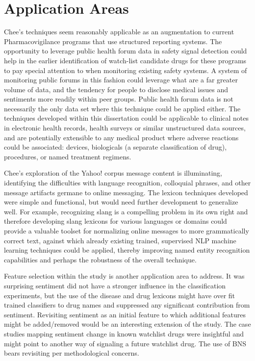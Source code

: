 \documentclass[twoside,11pt]{article}
\begin{document}
\section{Application Areas}
Chee's techniques seem reasonably applicable as an augmentation to current Pharmacovigilance programs that use structured reporting systems. The opportunity to leverage public health forum data in safety signal detection could help in the earlier identification of watch-list candidate drugs for these programs to pay special attention to when monitoring existing safety systems. A system of monitoring public forums in this fashion could leverage what are a far greater volume of data, and the tendency for people to disclose medical issues and sentiments more readily within peer groups. Public health forum data is not necessarily the only data set where this technique could be applied either. The techniques developed within this dissertation could be applicable to clinical notes in electronic health records, health surveys or similar unstructured data sources, and are potentially extensible to any medical product where adverse reactions could be associated: devices, biologicals (a separate classification of drug), procedures, or named treatment regimens.

Chee's exploration of the Yahoo! corpus message content is illuminating, identifying the difficulties with language recognition, colloquial phrases, and other message artifacts germane to online messaging. The lexicon techniques developed were simple and functional, but would need further development to generalize well. For example, recognizing slang is a compelling problem in its own right and therefore developing slang lexicons for various languages or domains could provide a valuable toolset for normalizing online messages to more grammatically correct text, against which already existing trained, supervised NLP machine learning techniques could be applied, thereby improving named entity recognition capabilities and perhaps the robustness of the overall technique.

Feature selection within the study is another application area to address. It was surprising sentiment did not have a stronger influence in the classification experiments, but the use of the disease and drug lexicons might have over fit trained classifiers to drug names and suppressed any significant contribution from sentiment. Revisiting sentiment as an initial feature to which additional features might be added/removed would be an interesting extension of the study. The case studies mapping sentiment change in known watchlist drugs were insightful and might point to another way of signaling a future watchlist drug. The use of BNS bears revisiting per methodological concerns.
\end{document}
